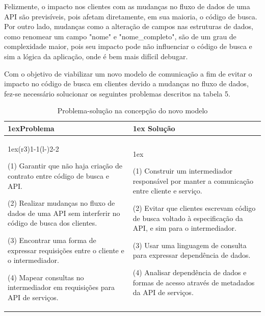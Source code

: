 Felizmente, o impacto nos clientes com as mudanças no fluxo de dados de uma API são previsíveis, pois afetam diretamente, em sua maioria, o código de busca. Por outro lado, mudanças como a alteração de campos nas estruturas de dados, como renomear um campo "nome" e "nome\_completo", são de um grau de complexidade maior, pois seu impacto pode não influenciar o código de busca e sim a lógica da aplicação, onde é bem mais difícil debugar.

Com o objetivo de viabilizar um novo modelo de comunicação a fim de evitar o impacto no código de busca em clientes devido a mudanças no fluxo de dados, fez-se necessário solucionar os seguintes problemas descritos na tabela 5. \\

\begin{table}[H]
  \begin{tabularx}{\linewidth}{>{\parskip1ex}X@{\kern4\tabcolsep}>{\parskip1ex}X}
    \toprule
    \hfil\bfseries Problema
    &
    \hfil\bfseries Solução
    \\\cmidrule(r{3\tabcolsep}){1-1}\cmidrule(l{-\tabcolsep}){2-2}

    (1) Garantir que não haja criação de contrato entre código de busca e API.\par
    (2) Realizar mudanças no fluxo de dados de uma API sem interferir no código de busca dos clientes.\par
    (3) Encontrar uma forma de expressar requisições entre o cliente e o intermediador.\par
    (4) Mapear consultas no intermediador em requisições para API de serviços.\par

    &

    (1) Construir um intermediador responsável por manter a comunicação entre cliente e serviço.\par
	(2) Evitar que clientes escrevam código de busca voltado à especificação da API, e sim para o intermediador.\par
    (3) Usar uma linguagem de consulta para expressar dependência de dados.\par
    (4) Analisar dependência de dados e formas de acesso através de metadados da API de serviços.\par

\\\bottomrule
  \end{tabularx}
  \caption{Problema-solução na concepção do novo modelo}
\end{table}

